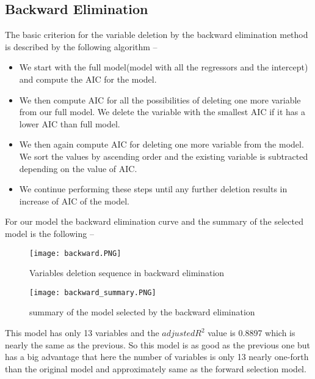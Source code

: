 \documentclass[A4paper,11pt]{report}
\begin{document}
	 \subsection{Backward Elimination}
	 The basic criterion for the variable deletion by the backward elimination method is described by the following algorithm -- 
	 \begin{itemize}
	 	\vspace{-0.2 cm} \item We start with the full model(model with all the regressors and the intercept) and compute the AIC for the model.
	 	\vspace{-0.2 cm} \item We then compute AIC for all the possibilities of deleting one more variable from our full model. We delete the variable with the smallest AIC if it has a lower AIC than full model.
	 	\vspace{-0.2 cm} \item We then again compute AIC for deleting one more variable from the model. We sort the values by ascending order and the existing variable is subtracted depending on the value of AIC.
	 	\vspace{-0.2 cm} \item We continue performing these steps until any further deletion results in increase of AIC of the model.
	 \end{itemize}
	 \par For our model the backward elimination curve and the summary of the selected model is the following --
	 \begin{figure}[H]
	 	\texttt{[image: backward.PNG]}
	 	\caption {Variables deletion sequence in backward elimination}
	 \end{figure}
	 \begin{figure}[H]
	 	\texttt{[image: backward\_summary.PNG]}
	 	\caption {summary of the model selected by the backward elimination}
	 \end{figure}
	 \par This model has only 13 variables and the $adjusted R^2$ value is 0.8897 which is nearly the same as the previous. So this model is as good as the previous one but has a big advantage that here the number of variables is only 13 nearly one-forth than the original model and approximately same as the forward selection model.
\end{document}
